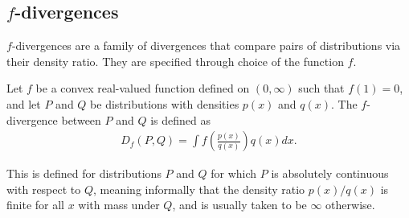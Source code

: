 \subsection{$f$-divergences}



$f$-divergences are a family of divergences that compare pairs of distributions via their density ratio. 
They are specified through choice of the function $f$.

\medskip

\begin{definition}
Let $f$ be a convex real-valued function defined on $(0, \infty)$ such that $f(1)=0$, and let $P$ and $Q$ be distributions with densities $p(x)$ and $q(x)$.
The $f$-divergence between $P$ and $Q$ is defined as
%
\begin{align*}
D_f(P, Q) = \int f\left(\frac{p(x)}{q(x)}\right) q(x) dx.
\end{align*}
%
\end{definition}
This is defined for distributions $P$ and $Q$ for which $P$ is absolutely continuous with respect to $Q$, meaning informally that the density ratio $p(x)/q(x)$ is finite for all $x$ with mass under $Q$, and is usually taken to be $\infty$ otherwise.

